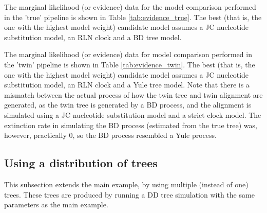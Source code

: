 

\newpage

The marginal likelihood (or evidence) data for the model comparison
performed in the 'true' pipeline is shown in Table \ref{tab:evidence_true}.
The best (that is, the one with the highest model weight)
candidate model assumes a JC nucleotide substitution model,
an RLN clock and a BD tree model.



\newpage

The marginal likelihood (or evidence) data for model comparison
performed in the 'twin' pipeline is shown in Table \ref{tab:evidence_twin}.
The best (that is, the one with the highest model weight)
candidate model assumes a JC nucleotide substitution model,
an RLN clock and a Yule tree model.
Note that there is a mismatch between the actual process of how the twin tree
and twin alignment are generated, as the twin tree is generated by a
BD process, and the alignment is simulated using a JC nucleotide
substitution model and a strict clock model. The extinction rate in simulating the BD process (estimated from the true tree) was, however, practically 0, so the BD process resembled a Yule process.



\newpage

\subsection{Using a distribution of trees}
\label{subsec:distribution}

This subsection extends the main example, by using multiple (instead of
one) trees. These trees are produced by running a DD tree simulation
with the same parameters as the main example.

